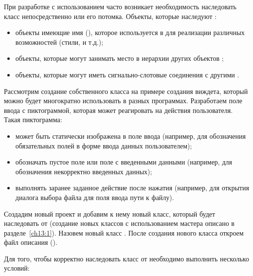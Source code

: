При разработке с использованием  часто возникает необходимость наследовать класс  непосредственно или
его потомка. Объекты, которые наследуют :

\begin{itemize}
\item объекты имеющие имя (), которое используется в  для реализации различных
возможностей (стили,  и т.д.);
\item объекты, которые могут занимать место в иерархии других объектов ;
\item объекты, которые могут иметь сигнально-слотовые соединения с другими .
\end{itemize}

Рассмотрим создание собственного класса на примере создания виждета, который можно будет многократно использовать в
разных программах. Разработаем поле ввода с пиктограммой, которая может реагировать на действия пользователя. Такая
пиктограмма:

\begin{itemize}
\item может быть статически изображена в поле ввода (например, для обозначения обязательных полей в форме ввода данных
пользователем);
\item обозначать пустое поле или поле с введенными данными (например, для обозначения некорректно введенных данных);
\item выполнять заранее заданное действие после нажатия (например, для открытия диалога выбора файла для поля ввода пути
к файлу).
\end{itemize}

Создадим новый проект и добавим к нему новый класс, который будет наследовать от  (создание новых
классов с использованием мастера описано в разделе~\ref{ch13:1}). Назовем новый класс . После создания
нового класса откроем файл описания ().

Для того, чтобы корректно наследовать класс от  необходимо выполнить несколько условий:

